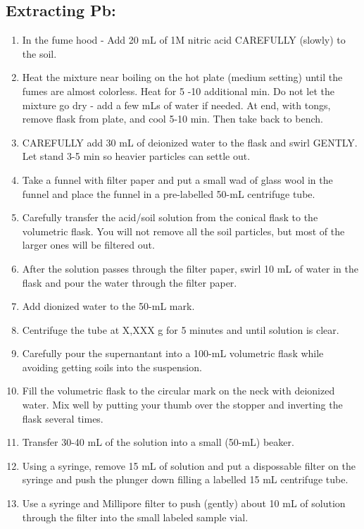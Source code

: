 \documentclass[12pt]{../SOP3_alpha}\usepackage[]{graphicx}\usepackage[]{color}
\begin{document}
\subsection {Extracting Pb:}
  \begin{enumerate}
    \item In the fume hood - Add 20 mL of 1M nitric acid CAREFULLY (slowly) to the soil.
    \item Heat the mixture near boiling on the hot plate (medium setting) until the fumes are almost colorless. Heat for 5 -10 additional min. Do not let the mixture go dry - add a few mLs of water if needed. At end, with tongs, remove flask from plate, and cool 5-10 min. Then take back to bench.
    \item CAREFULLY add 30 mL of deionized water to the flask and swirl GENTLY. Let stand 3-5 min so heavier particles can  settle out.
    \item Take a funnel with filter paper and put a small wad of glass wool in the funnel and place the funnel in a pre-labelled 50-mL centrifuge tube. 
    \item Carefully transfer the acid/soil solution from the conical flask to the volumetric flask. You will not remove all the soil particles, but most of the larger ones will be filtered out.
    \item After the solution passes through the filter paper, swirl 10 mL of water in the flask and pour the water through the filter paper. 

    \item Add dionized water to the 50-mL mark.

    \item Centrifuge the tube at X,XXX g for 5 minutes and until solution is clear. 

    \item Carefully pour the supernantant into a 100-mL volumetric flask while avoiding getting soils into the suspension. 

    \item Fill the volumetric flask to the circular mark on the neck with deionized water. Mix well by putting your thumb over the stopper and inverting the flask several times. 

    \item Transfer 30-40 mL of the solution into a small (50-mL) beaker.

    \item Using a syringe, remove 15 mL of solution and put a dispossable filter on the syringe and push the plunger down filling a labelled 15 mL centrifuge tube. 

    \item Use a syringe and Millipore filter to push (gently) about 10 mL of solution through the filter into the small labeled sample vial.
   \end{enumerate}
   
\end{document}
